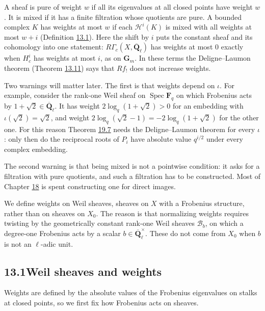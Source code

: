\documentclass[11pt]{article}
\begin{document}
A sheaf is pure of weight \(w\) if all its eigenvalues at all closed points have weight \(w\). It is mixed if it has a finite filtration whose quotients are pure. A bounded complex \(K\) has weights at most \(w\) if each \(\mathcal H^i(K)\) is mixed with all weights at most \(w+i\) (Definition \hyperref[bp9]{13.1}). Here the shift by \(i\) puts the constant sheaf and its cohomology into one statement: \(R\Gamma_c(X,\overline{\mathbf Q}_\ell)\) has weights at most \(0\) exactly when \(H^i_c\) has weights at most \(i\), as on \(\mathbf G_m\). In these terms the Deligne–Laumon theorem (Theorem \hyperref[bp38]{13.11}) says that \(Rf_!\) does not increase weights.

Two warnings will matter later. The first is that weights depend on \(\iota\). For example, consider the rank-one Weil sheaf on \(\operatorname{Spec}\mathbf F_q\) on which Frobenius acts by \(1+\sqrt2\in\overline{\mathbf Q}_\ell\). It has weight \(2\log_q(1+\sqrt2)>0\) for an embedding with \(\iota(\sqrt2)=\sqrt2\), and weight \(2\log_q(\sqrt2-1)=-2\log_q(1+\sqrt2)\) for the other one. For this reason Theorem \hyperref[bp342]{19.7} needs the Deligne–Laumon theorem for every \(\iota\): only then do the reciprocal roots of \(P_i\) have absolute value \(q^{i/2}\) under every complex embedding.

The second warning is that being mixed is not a pointwise condition: it asks for a filtration with pure quotients, and such a filtration has to be constructed. Most of Chapter \hyperref[bp271]{18} is spent constructing one for direct images.

We define weights on Weil sheaves, sheaves on \(X\) with a Frobenius structure, rather than on sheaves on \(X_0\). The reason is that normalizing weights requires twisting by the geometrically constant rank-one Weil sheaves \(\mathcal B_b\), on which a degree-one Frobenius acts by a scalar \(b\in\overline{\mathbf Q}_\ell^\times\). These do not come from \(X_0\) when \(b\) is not an \(\ell\)-adic unit.

\subsection*{\texorpdfstring{13.1\quad Weil sheaves and weights}{13.1 Weil sheaves and weights}}
\label{bp5}%
\label{bp6}%
Weights are defined by the absolute values of the Frobenius eigenvalues on stalks at closed points, so we first fix how Frobenius acts on sheaves.
\end{document}
